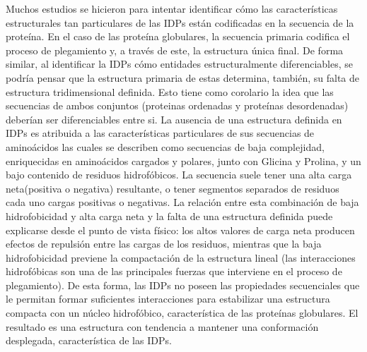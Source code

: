 Muchos estudios se hicieron para intentar identificar cómo las características  estructurales tan particulares de las IDPs están codificadas en la secuencia de la proteína.
En el caso de las proteína globulares, la secuencia primaria codifica el proceso de plegamiento y, a través de este, la estructura única final. 
De forma similar, al identificar la IDPs cómo entidades estructuralmente diferenciables, se podría pensar que la estructura primaria de estas determina, también, su falta de estructura tridimensional definida.
Esto tiene como corolario la idea que las secuencias de ambos conjuntos (proteinas ordenadas y proteínas desordenadas) deberían ser diferenciables entre si.
La ausencia de una estructura definida en IDPs es atribuida a las características particulares de sus secuencias de aminoácidos las cuales se describen como secuencias de baja complejidad, enriquecidas en aminoácidos 
cargados y polares, junto con Glicina y Prolina, y un bajo contenido de residuos hidrofóbicos. 
La secuencia suele tener una alta carga neta(positiva o negativa) resultante, o tener segmentos separados de residuos cada uno cargas positivas o negativas.
La relación entre esta combinación de baja hidrofobicidad y alta carga neta y la falta de una estructura definida puede explicarse desde el punto de vista físico:
los altos valores de carga neta producen efectos de repulsión entre las cargas de los residuos, mientras que la baja hidrofobicidad previene la compactación de la estructura lineal
(las interacciones hidrofóbicas son una de las principales fuerzas que interviene en el proceso de plegamiento).
De esta forma, las IDPs no poseen las propiedades secuenciales que le permitan formar suficientes interacciones para estabilizar una estructura compacta con un núcleo hidrofóbico, característica de las proteínas globulares.
El resultado es una estructura con tendencia a mantener una conformación desplegada, característica de las IDPs.

 
% 



